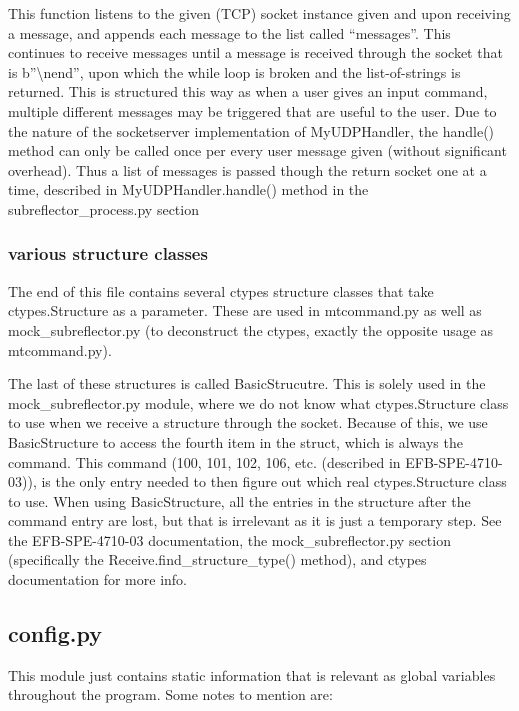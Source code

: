 \documentclass{article}
\begin{document}
This function listens to the given (TCP) socket instance given and upon receiving a message, and appends each message to the list called ``messages''. This continues to receive messages until a message is received through the socket that is b''\textbackslash nend'', upon which the while loop is broken and the list-of-strings is returned. This is structured this way as when a user gives an input command, multiple different messages may be triggered that are useful to the user. Due to the nature of the socketserver implementation of MyUDPHandler, the handle() method can only be called once per every user message given (without significant overhead). Thus a list of messages is passed though the return socket one at a time, described in MyUDPHandler.handle() method in the subreflector\_process.py section


\subsubsection*{various structure classes}
The end of this file contains several ctypes structure classes that take ctypes.Structure as a parameter. These are used in mtcommand.py as well as mock\_subreflector.py (to deconstruct the ctypes, exactly the opposite usage as mtcommand.py). 

\vspace{10pt}

The last of these structures is called BasicStrucutre. This is solely used in the mock\_subreflector.py module, where we do not know what ctypes.Structure class to use when we receive a structure through the socket. Because of this, we use BasicStructure to access the fourth item in the struct, which is always the command. This command  (100, 101, 102, 106, etc. (described in EFB-SPE-4710-03)), is the only entry needed to then figure out which real ctypes.Structure class to use. When using BasicStructure, all the entries in the structure after the command entry are lost, but that is irrelevant as it is just a temporary step. See the EFB-SPE-4710-03 documentation, the mock\_subreflector.py section (specifically the Receive.find\_structure\_type() method), and ctypes documentation for more info.



\newpage
\subsection{config.py}

This module just contains static information that is relevant as global variables throughout the program. Some notes to mention are:
\end{document}
